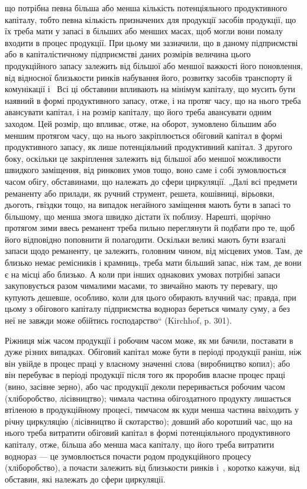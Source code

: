 \parcont{}  %
що потрібна певна більша або менша кількість потенціяльного продуктивного капіталу, тобто певна
кількість призначених для продукції засобів продукції, що їх треба мати у запасі в більших або
менших масах, щоб могли вони помалу входити в процес продукції. При цьому ми зазначили, що в даному
підприємстві або в капіталістичному підприємстві даних розмірів величина цього продукційного запасу
залежить від більшої або меншої важкості його поновлення, від відносної близькости ринків набування
його, розвитку засобів транспорту й комунікації і~ Всі ці обставини впливають на мінімум
капіталу, що мусить бути наявний в формі продуктивного запасу, отже, і на протяг часу, що на нього
треба авансувати капітал, і на розмір капіталу, що його треба авансувати одним заходом. Цей розмір,
що впливає, отже, на оборот, зумовлено більшим або меншим протягом часу, що на нього закріплюється
обіговий капітал в формі продуктивного запасу, як лише потенціяльний продуктивний капітал. З другого
боку, оскільки це закріплення залежить від більшої або меншої можливости швидкого заміщення, від
ринкових умов тощо, воно саме і собі зумовлюється часом обігу, обставинами, що належать до сфери
циркуляції. „Далі всі предмети реманенту або прилади, як ручний струмент, решета, кошівниці,
вірьовки, дьоготь, гвіздки тощо, на випадок негайного заміщення мають бути в запасі то більшому, що
менша змога швидко дістати їх поблизу. Нарешті, щорічно протягом зими ввесь реманент треба пильно
переглянути й подбати про те, щоб його відповідно поповнити й полагодити. Оскільки великі мають бути
взагалі запаси щодо реманенту, це залежить, головним чином, від місцевих умов. Там, де близько немає
ремісників і крамниць, треба мати більший запас, ніж там, де вони є на місці або близько. А коли при
інших однакових умовах потрібні запаси закуповується разом чималими масами, то звичайно мають ту
перевагу, що купують дешевше, особливо, коли для цього обирають влучний час; правда, при цьому з
обігового капіталу підприємства воднораз береться чималу суму, а без неї не завжди може обійтись
господарство“ (Kirchhof, p. 301).

Ріжниця між часом продукції і робочим часом може, як ми бачили, поставати в дуже різних випадках.
Обіговий капітал може бути в періоді продукції раніш, ніж він увійде в процес праці у власному
значенні слова (виробництво копил); або він перебуває в періоді продукції після того як проробив
власне процес праці (вино, засівне зерно), або час продукції деколи переривається робочим часом
(хліборобство, лісівництво); чимала частина обігоздатного продукту лишається втіленою в
продукційному процесі, тимчасом як куди менша частина ввіходить у річну циркуляцію (лісівництво й
скотарство); довший або коротший час, що на нього треба витратити обіговий капітал в формі
потенціяльного продуктивного капіталу, отже, більша або менша маса капіталу, що його треба витратити
воднораз — це зумовлюється почасти родом продукційного процесу (хліборобство), а почасти залежить
від близькости ринків і~, коротко кажучи, від обставин, які належать до сфери циркуляції.

